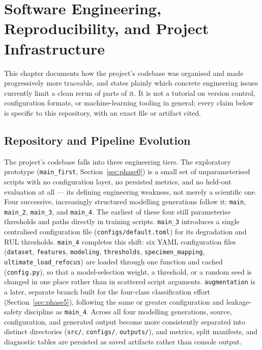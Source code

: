 \chapter{Software Engineering, Reproducibility, and Project Infrastructure}
\label{ch:engineering}

This chapter documents how the project's codebase was organised and made
progressively more traceable, and states plainly which concrete engineering
issues currently limit a clean rerun of parts of it. It is not a tutorial
on version control, configuration formats, or machine-learning tooling in
general; every claim below is specific to this repository, with an exact
file or artifact cited.

\section{Repository and Pipeline Evolution}
\label{sec:eng-evolution}

The project's codebase falls into three engineering tiers. The
exploratory prototype (\texttt{main\_first}, Section~\ref{sec:phase0}) is
a small set of unparameterised scripts with no configuration layer, no
persisted metrics, and no held-out evaluation at all — its defining
engineering weakness, not merely a scientific one. Four successive,
increasingly structured modelling generations follow it:
\texttt{main}, \texttt{main\_2}, \texttt{main\_3}, and \texttt{main\_4}.
The earliest of these four still parameterise thresholds and paths
directly in training scripts. \texttt{main\_3} introduces a single
centralised configuration file (\texttt{configs/default.toml}) for its
degradation and RUL thresholds. \texttt{main\_4} completes this shift: six
YAML configuration files (\texttt{dataset}, \texttt{features},
\texttt{modeling}, \texttt{thresholds}, \texttt{specimen\_mapping},
\texttt{ultimate\_load\_refocus}) are loaded through one function and
cached (\texttt{config.py}), so that a model-selection weight, a
threshold, or a random seed is changed in one place rather than in
scattered script arguments. \texttt{augmentation} is a later, separate
branch built for the four-class classification effort
(Section~\ref{sec:phase5}), following the same or greater configuration and
leakage-safety discipline as \texttt{main\_4}. Across all four modelling
generations, source, configuration, and generated output become more
consistently separated into distinct directories (\texttt{src/},
\texttt{configs/}, \texttt{outputs/}), and metrics, split manifests, and
diagnostic tables are persisted as saved artifacts rather than console
output.

